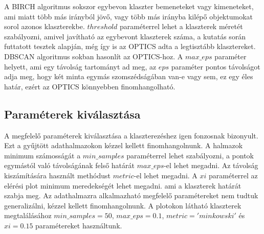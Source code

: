 \documentclass[acmtog, authorversion]{acmart}
\begin{document}
A BIRCH algoritmus sokszor egybevon klaszter bemeneteket vagy kimeneteket, ami miatt több más irányból jövő, vagy több más irányba kilépő objektumokat sorol azonos klaszterekbe.
\begin{math}threshold\end{math} paraméterrel lehet a klaszterek méretét szabályozni, amivel javítható az egybevont klaszterek száma, a kutatás során futtatott tesztek alapján, még
így is az OPTICS adta a legtisztább klasztereket. 
DBSCAN algoritmus sokban hasonlít az OPTICS-hoz. A \begin{math}max\_eps\end{math} paraméter helyett, ami egy távolság tartományt ad meg, az \begin{math}eps\end{math} paraméter  
pontos távolságot adja meg, hogy két minta egymás szomszédságában van-e vagy sem, ez egy éles határ, ezért az OPTICS könnyebben finomhangolható.

\subsection{Paraméterek kiválasztása}
A megfelelő paraméterek kiválasztása a klaszterezéshez igen fonzosnak bizonyult. Ezt a gyűjtött adathalmazokon kézzel kellett finomhangolnunk.
A halmazok minimum számosságát a \begin{math}min\_samples\end{math} paraméterrel lehet szabályozni, a pontok egymástól való távolságának
felső határát \begin{math}max\_eps\end{math}-el lehet megadni. Az távolság kiszámítására használt methódust \begin{math}metric\end{math}-el
lehet megadni. A \begin{math}xi\end{math} paraméterrel az elérési plot minimum meredekségét lehet megadni. ami a klaszterek határát szabja meg.
Az adathalmazra alkalmazható megfelelő paramétereket nem tudtuk generalizálni, kézzel kellett finomhangolnunk. A plotokon látható klaszterek
megtalálásához \begin{math}min\_samples=50\end{math}, \begin{math}max\_eps=0.1\end{math}, \begin{math}metric='minkowski'\end{math} és \begin{math}xi=0.15\end{math}
paramétereket használtunk.
\end{document}
